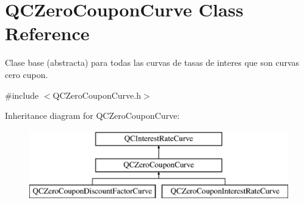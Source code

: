 \hypertarget{class_q_c_zero_coupon_curve}{\section{Q\+C\+Zero\+Coupon\+Curve Class Reference}
\label{class_q_c_zero_coupon_curve}
}


Clase base (abstracta) para todas las curvas de tasas de interes que son curvas cero cupon.  




{\ttfamily \#include $<$Q\+C\+Zero\+Coupon\+Curve.\+h$>$}

Inheritance diagram for Q\+C\+Zero\+Coupon\+Curve\+:\begin{figure}[H]
\begin{center}
\leavevmode
\includegraphics[height=3.000000cm]{class_q_c_zero_coupon_curve}
\end{center}
\end{figure}
